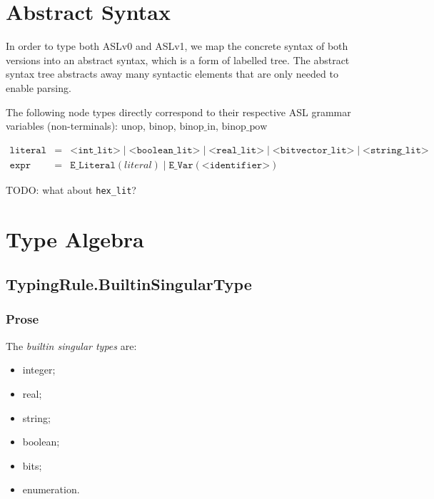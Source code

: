 \documentclass{book}
\begin{document}
\chapter{Abstract Syntax}
In order to type both ASLv0 and ASLv1, we map the concrete syntax of both versions into an abstract syntax, which is a form of labelled tree. The abstract syntax tree abstracts away many syntactic elements that are only needed to enable parsing.

\newcommand\BNOT[0]{\texttt{"!"}}
\newcommand\NEG[0]{\texttt{"-"}}
\newcommand\NOT[0]{\texttt{"NOT"}}

\newcommand\unop[0]{\textrm{unop}}
\newcommand\binop[0]{\textrm{binop}}
\newcommand\binopin[0]{\textrm{binop\_in}}
\newcommand\binoppow[0]{\textrm{binop\_pow}}

\newcommand\literal[0]{\texttt{literal}}
\newcommand\expr[0]{\texttt{expr}}

The following node types directly correspond to their respective ASL grammar variables (non-terminals):  $\unop$, $\binop$, $\binopin$, $\binoppow$

\[
\begin{array}{rcl}
\literal &=& \texttt{<int\_lit>} \;|\; \texttt{<boolean\_lit>} \;|\; \texttt{<real\_lit>} \;|\; \texttt{<bitvector\_lit>} \;|\; \texttt{<string\_lit>}\\
\expr &=& \texttt{E\_Literal}(literal) \;|\; \texttt{E\_Var}(\texttt{<identifier>})
\end{array}
\]

TODO: what about \texttt{hex\_lit}?

\chapter{Type Algebra}

\section{TypingRule.BuiltinSingularType \label{sec:TypingRule.BuiltinSingularType}}

    \subsection{Prose}
    The \emph{builtin singular types} are:
    \begin{itemize}
    \item integer;
    \item real;
    \item string;
    \item boolean;
    \item bits;
    \item enumeration.
    \end{itemize}
\end{document}
